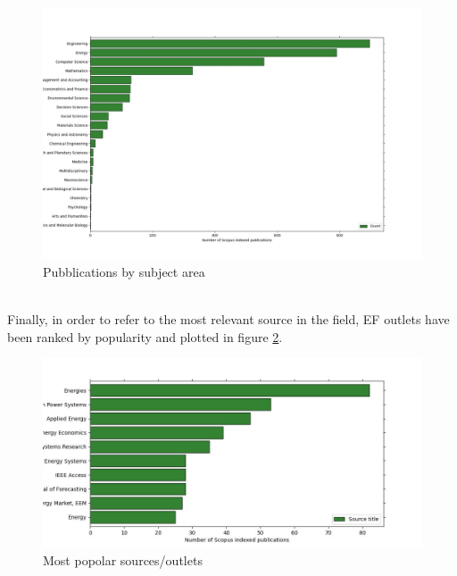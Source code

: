 \begin{figure}
  \includegraphics[width=\textwidth]{images/subject_area.jpg}
  \caption{Pubblications by subject area}
  \label{fig:subject_area}
\end{figure}
\\
Finally, in order to refer to the most relevant source in the field, EF outlets have been ranked by popularity and plotted in figure \ref{fig:src_title}.
\begin{figure}
  \includegraphics[width=\textwidth]{images/src_title.jpg}
  \caption{Most popolar sources/outlets}
  \label{fig:src_title}
\end{figure}
\\
